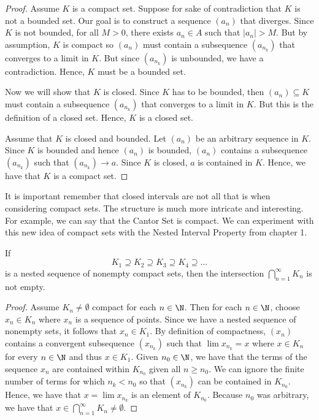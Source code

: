 \begin{proof}
    Assume \( K \) is a compact set. Suppose for sake of contradiction that \( K \) is not a bounded set. Our goal is to construct a sequence \( (a_n) \) that diverges. Since \( K \) is not bounded, for all \( M > 0  \), there exists \( a_n \in A \) such that \( | a_n | > M  \). But by assumption, \( K \) is compact so \( (a_n) \) must contain a subsequence \( (a_{n_k}) \) that converges to a limit in \( K \). But since \( (a_{n_k}) \) is unbounded, we have a contradiction. Hence, \( K \) must be a bounded set. 

    Now we will show that \( K \) is closed. Since \( K \) has to be bounded, then \( (a_n) \subseteq K  \) must contain a subsequence \( (a_{n_k}) \) that converges to a limit in \( K \). But this is the definition of a closed set. Hence, \( K \) is a closed set.

    Assume that \( K \) is closed and bounded. Let \( (a_n) \) be an arbitrary sequence in \( K \). Since \( K  \) is bounded and hence \( (a_n) \) is bounded, \( (a_n) \) contains a subsequence \( (a_{n_k}) \) such that \( (a_{n_k}) \to a  \). Since \( K  \) is closed, \( a  \) is contained in \( K \). Hence, we have that \( K \) is a compact set.
\end{proof}

It is important remember that closed intervals are not all that is when considering compact sets. The structure is much more intricate and interesting. For example, we can say that the Cantor Set is compact. We can experiment with this new idea of compact sets with the Nested Interval Property from chapter 1.


\begin{tcolorbox}
    \begin{thm}
    If 
    \[ K_1 \supseteq K_2 \supseteq K_3 \supseteq K_4 \supseteq \dots \]
    is a nested sequence of nonempty compact sets, then the intersection \( \bigcap_{ n=1 }^{ \infty  } K_n  \) is not empty.
    \end{thm}
\end{tcolorbox}

\begin{proof}
    Assume \( K_n \neq \emptyset  \) compact for each \( n \in \N \). Then for each \(  n \in \N \), choose \( x_n \in K_n \) where \( x_n \) is a sequence of points. Since we have a nested sequence of nonempty sets, it follows that \( x_n \in K_1 \). By definition of compactness, \( (x_n) \) contains a convergent subsequence \( (x_{n_k}) \) such that \( \lim x_{n_k} = x  \) where \( x \in K_n \) for every \( n \in \N \) and thus \( x \in K_1 \). Given \( n_0 \in \N \), we have that the terms of the sequence \( x_n  \) are contained within \( K_{n_0} \) given all \( n \geq n_0 \). We can ignore the finite number of terms for which \( n_k < n_0  \) so that \( (x_{n_k}) \) can be contained in \( K_{n_0} \). Hence, we have that \( x = \lim x_{n_k} \) is an element of \( K_{n_0} \). Because \( n_0  \) was arbitrary, we have that \( x \in \bigcap_{ n=1 }^{ \infty  } K_n \neq \emptyset\).
\end{proof}

